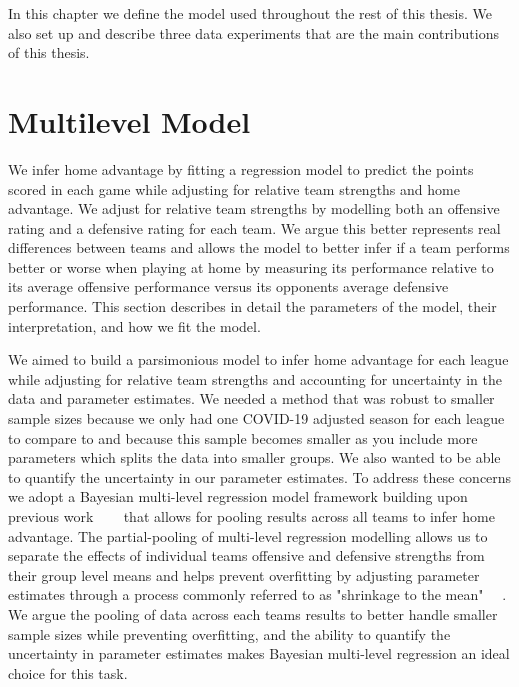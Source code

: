 In this chapter we define the model used throughout the rest of this thesis. We also set up and describe three data experiments that are the main contributions of this thesis.

\section{Multilevel Model} \label{multilevel_model}

We infer home advantage by fitting a regression model to predict the points scored in each game while adjusting for relative team strengths and home advantage. We adjust for relative team strengths by modelling both an offensive rating and a defensive rating for each team. We argue this better represents real differences between teams and allows the model to better infer if a team performs better or worse when playing at home by measuring its performance relative to its average offensive performance versus its opponents average defensive performance. This section describes in detail the parameters of the model, their interpretation, and how we fit the model.

We aimed to build a parsimonious model to infer home advantage for each league while adjusting for relative team strengths and accounting for uncertainty in the data and parameter estimates. We needed a method that was robust to smaller sample sizes because we only had one COVID-19 adjusted season for each league to compare to and because this sample becomes smaller as you include more parameters which splits the data into smaller groups. We also wanted to be able to quantify the uncertainty in our parameter estimates. To address these concerns we adopt a Bayesian multi-level regression model framework building upon previous work \mbox{\cite{Baio2010} \cite{Glickman1998} \cite{Lopez2018} \cite{Benz2020}} that allows for pooling results across all teams to infer home advantage. The partial-pooling of multi-level regression modelling allows us to separate the effects of individual teams offensive and defensive strengths from their group level means and helps prevent overfitting by adjusting parameter estimates through a process commonly referred to as "shrinkage to the mean" \mbox{\cite{Gelman2014} \cite{Gelman2006} \cite{McElreath2020}}. We argue the pooling of data across each teams results to better handle smaller sample sizes while preventing overfitting, and the ability to quantify the uncertainty in parameter estimates makes Bayesian multi-level regression an ideal choice for this task.

